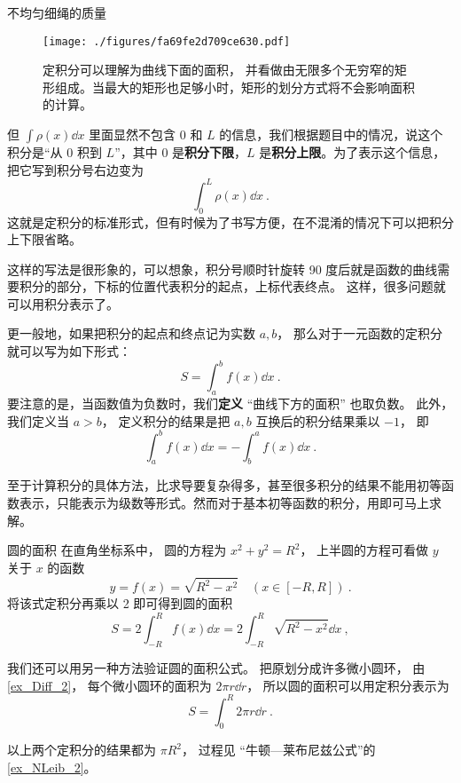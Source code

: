 \begin{example}{不均匀细绳的质量}
\begin{figure}[ht]
\centering
\texttt{[image: ./figures/fa69fe2d709ce630.pdf]}
\caption{定积分可以理解为曲线下面的面积， 并看做由无限多个无穷窄的矩形组成。当最大的矩形也足够小时，矩形的划分方式将不会影响面积的计算。} \label{fig_DefInt_4}
\end{figure}

但 $\int \rho(x) \dd{x}$ 里面显然不包含 $0$ 和 $L$ 的信息，我们根据题目中的情况，说这个积分是“从 $0$ 积到 $L$”，其中 $0$ 是\textbf{积分下限}，$L$ 是\textbf{积分上限}。为了表示这个信息，把它写到积分号右边变为
\begin{equation}
\int_0^L \rho(x) \dd{x}~.
\end{equation}
这就是定积分的标准形式，但有时候为了书写方便，在不混淆的情况下可以把积分上下限省略。
\end{example}

这样的写法是很形象的，可以想象，积分号顺时针旋转 90 度后就是函数的曲线需要积分的部分，下标的位置代表积分的起点，上标代表终点。 这样，很多问题就可以用积分表示了。

更一般地，如果把积分的起点和终点记为实数 $a,b$， 那么对于一元函数的定积分就可以写为如下形式：
\begin{equation}
S=\int^b_a f(x) \dd x~.
\end{equation}
要注意的是，当函数值为负数时，我们\textbf{定义} “曲线下方的面积” 也取负数。 此外，我们定义当 $a > b$， 定义积分的结果是把 $a,b$ 互换后的积分结果乘以 $-1$， 即
\begin{equation}
\int^b_a f(x) \dd x = -\int^a_b f(x) \dd x~.
\end{equation}

至于计算积分的具体方法，比求导要复杂得多，甚至很多积分的结果不能用初等函数表示，只能表示为级数等形式。然而对于基本初等函数的积分，用即可马上求解。

\begin{example}{圆的面积}\label{ex_DefInt_2}
在直角坐标系中， 圆的方程为 $x^2 + y^2 = R^2$， 上半圆的方程可看做 $y$ 关于 $x$ 的函数
\begin{equation}
y = f(x) = \sqrt{R^2 - x^2} \quad (x\in [-R,R])~.
\end{equation}
将该式定积分再乘以 2 即可得到圆的面积
\begin{equation}
S = 2\int_{-R}^{R} f(x) \dd{x} = 2\int_{-R}^{R} \sqrt{R^2 - x^2} \dd{x}~,
\end{equation}

我们还可以用另一种方法验证圆的面积公式。 把原划分成许多微小圆环， 由\autoref{ex_Diff_2}， 每个微小圆环的面积为 $2\pi r\dd{r}$， 所以圆的面积可以用定积分表示为
\begin{equation}
S = \int_0^{R} 2\pi r\dd{r}~.
\end{equation}

以上两个定积分的结果都为 $\pi R^2$， 过程见 “牛顿—莱布尼兹公式”的\autoref{ex_NLeib_2}。
\end{example}

